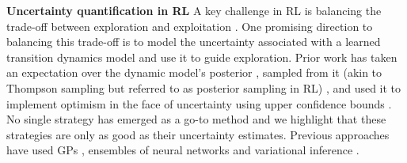 \documentclass{article}
\begin{document}
\textbf{Uncertainty quantification in RL}
A key challenge in RL is balancing the trade-off between exploration and exploitation \cite{sutton2018reinforcement}.
One promising direction to balancing this trade-off is to model the uncertainty associated with a learned transition dynamics model and use it to guide exploration.
Prior work has taken an expectation over the dynamic model's posterior \cite{deisenroth2011pilco,kamtheDataEfficient2018,chuaDeepReinforcementLearning2018},
sampled from it (akin to Thompson sampling but referred to as posterior sampling in RL)
\cite{osbandMoreEfficientReinforcement2013},
and used it to implement optimism in the face of uncertainty using upper confidence bounds \cite{curiEfficient2020}.
No single strategy has emerged as a go-to method and we highlight that these strategies are only as good as their uncertainty estimates.
Previous approaches have used GPs \cite{deisenroth2011pilco,kamtheDataEfficient2018},
ensembles of neural networks \cite{curiEfficient2020,chuaDeepReinforcementLearning2018}
and variational inference \cite{galImproving2016,houthooftVIME2017}. 






\end{document}

